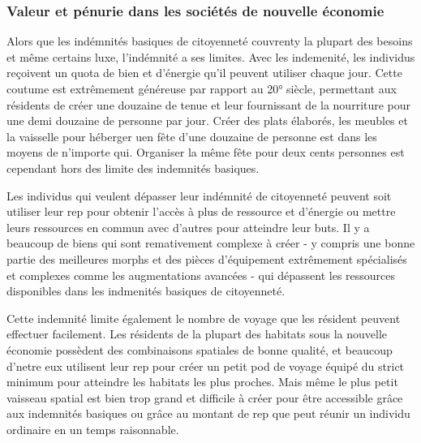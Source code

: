                \subsubsection{Valeur et pénurie dans les sociétés de nouvelle économie} \label{sec:value-scarcity-new} 

               Alors que les indémnités basiques de citoyenneté couvrenty la plupart des besoins et même certains luxe, l'indémnité a ses limites. Avec les indemenité, les individus reçoivent un quota de bien et d'énergie qu'il peuvent utiliser chaque jour. Cette coutume est extrêmement généreuse par rapport au 20° siècle, permettant aux résidents de créer une douzaine de tenue et leur fournissant de la nourriture pour une demi douzaine de personne par jour. Créer des plats élaborés, les meubles et la vaisselle pour héberger uen fête d'une douzaine de personne est dans les moyens de n'importe qui. Organiser la même fête pour deux cents personnes est cependant hors des limite des indemnités basiques. 

               Les individus qui veulent dépasser leur indémnité de citoyenneté peuvent soit utiliser leur rep pour obtenir l'accès à plus de ressource et d'énergie ou mettre leurs ressources en commun avec d'autres pour atteindre leur buts. Il y a beaucoup de biens qui sont remativement complexe à créer - y compris une bonne partie des meilleures morphs et des pièces d'équipement extrêmement spécialisés et complexes comme les augmentations avancées - qui dépassent les ressources disponibles dans les indmenités basiques de citoyenneté. 

               Cette indemnité limite également le nombre de voyage que les résident peuvent effectuer facilement. Les résidents de la plupart des habitats sous la nouvelle économie possèdent des combinaisons spatiales de bonne qualité, et beaucoup d'netre eux utilisent leur rep pour créer un petit pod de voyage équipé du strict minimum pour atteindre les habitats les plus proches. Mais même le plus petit vaisseau spatial est bien trop grand et difficile à créer pour être accessible grâce aux indemnités basiques ou grâce au montant de rep que peut réunir un individu ordinaire en un temps raisonnable. 

